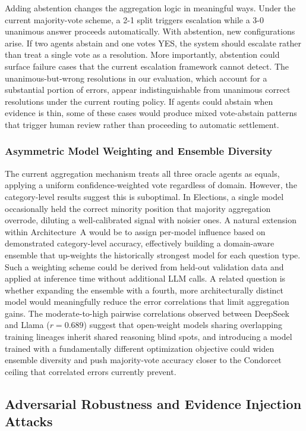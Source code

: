 Adding abstention changes the aggregation logic in meaningful ways. Under the current majority-vote scheme, a 2-1 split triggers escalation while a 3-0 unanimous answer proceeds automatically. With abstention, new configurations arise. If two agents abstain and one votes YES, the system should escalate rather than treat a single vote as a resolution. More importantly, abstention could surface failure cases that the current escalation framework cannot detect. The unanimous-but-wrong resolutions in our evaluation, which account for a substantial portion of errors, appear indistinguishable from unanimous correct resolutions under the current routing policy. If agents could abstain when evidence is thin, some of these cases would produce mixed vote-abstain patterns that trigger human review rather than proceeding to automatic settlement.

\subsubsection{Asymmetric Model Weighting and Ensemble Diversity}

The current aggregation mechanism treats all three oracle agents as equals, applying a uniform confidence-weighted vote regardless of domain. However, the category-level results suggest this is suboptimal. In Elections, a single model occasionally held the correct minority position that majority aggregation overrode, diluting a well-calibrated signal with noisier ones. A natural extension within Architecture~A would be to assign per-model influence based on demonstrated category-level accuracy, effectively building a domain-aware ensemble that up-weights the historically strongest model for each question type. Such a weighting scheme could be derived from held-out validation data and applied at inference time without additional LLM calls. A related question is whether expanding the ensemble with a fourth, more architecturally distinct model would meaningfully reduce the error correlations that limit aggregation gains. The moderate-to-high pairwise correlations observed between DeepSeek and Llama ($r = 0.689$) suggest that open-weight models sharing overlapping training lineages inherit shared reasoning blind spots, and introducing a model trained with a fundamentally different optimization objective could widen ensemble diversity and push majority-vote accuracy closer to the Condorcet ceiling that correlated errors currently prevent.

\subsection{Adversarial Robustness and Evidence Injection Attacks}

